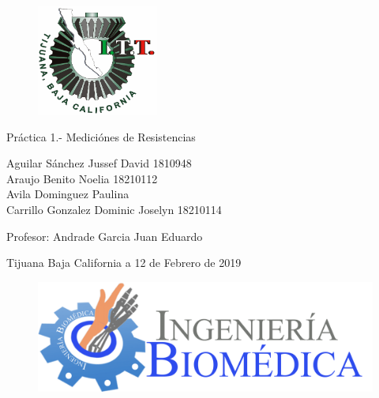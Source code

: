 \documentclass[11pt,a4paper]{report}
\begin{document}
	
	\begin{titlepage}
		
		\begin{center}
			\vspace*{-1in}
			\begin{figure}[t]
				\begin{flushleft}
					\includegraphics[width=4cm]{LOGO_ITT_2005}
					
				\end{flushleft}
			\end{figure}
		
			
				\begin{huge}
					\vspace*{3cm}
					Pr\'actica 1.- Medici\'ones de Resistencias\\
					\vspace*{3cm}
				\end{huge}
			\begin{Large}
			
			Aguilar S\'anchez Jussef David \hspace{3cm}1810948\\
			Araujo Benito Noelia \hspace{3cm} 18210112\\
			Avila Dominguez Paulina\\
			Carrillo Gonzalez Dominic Joselyn \hspace{3cm}18210114\\
			
			
			\vspace*{4cm}
		
				Profesor: Andrade Garcia Juan Eduardo \\
			
			\vspace*{4cm}
			
				Tijuana Baja California a 12 de Febrero de 2019 \\
			\end{Large}
			
			\begin{figure}[b]
				\begin{flushright}
					\includegraphics[width=0.4\linewidth]{BIOMEDICA_HEADING1-2048x672}
					
					\label{fig:biomedicaheading1-2048x672}
				\end{flushright}
				
			\end{figure}
			
		
		\end{center}
		
	\end{titlepage}
	
\end{document}
